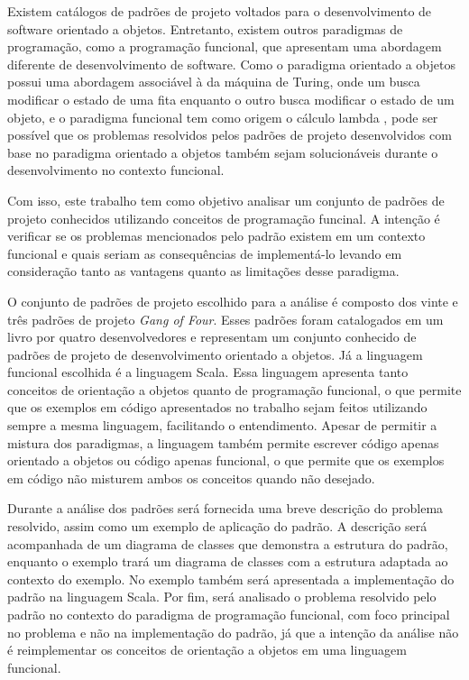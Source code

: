 
Existem catálogos de padrões de projeto 
voltados para o desenvolvimento de software 
orientado a objetos.\cite{gamma:1995} Entretanto, existem 
outros paradigmas de programação, como 
a programação funcional, que apresentam 
uma abordagem diferente de desenvolvimento 
de software.
Como o paradigma orientado a objetos possui uma 
abordagem associável à da máquina de Turing, onde um 
busca modificar o estado de uma fita enquanto o outro 
busca modificar o estado de um objeto, e o paradigma 
funcional tem como origem o cálculo lambda
\cite{michaelson:2011}, pode ser possível que os problemas 
resolvidos pelos padrões de projeto desenvolvidos 
com base no paradigma orientado a objetos também 
sejam solucionáveis durante o desenvolvimento 
no contexto funcional. 


Com isso, este trabalho tem como objetivo 
analisar um conjunto de padrões de projeto 
conhecidos utilizando conceitos de programação 
funcinal. A intenção é verificar se os 
problemas mencionados pelo padrão existem 
em um contexto funcional e quais 
seriam as consequências de implementá-lo 
levando em consideração tanto as vantagens 
quanto as limitações desse paradigma.


O conjunto de padrões de projeto escolhido 
para a análise é composto dos vinte e três 
padrões de projeto \textit{Gang of Four}. 
Esses padrões foram catalogados em um livro 
por quatro desenvolvedores e representam 
um conjunto conhecido de padrões de projeto 
de desenvolvimento orientado a objetos. \cite{gamma:1995}
Já a linguagem funcional escolhida é a 
linguagem Scala. Essa linguagem 
apresenta tanto conceitos de orientação 
a objetos quanto de programação funcional, 
o que permite que os exemplos em código 
apresentados no trabalho sejam feitos 
utilizando sempre a mesma linguagem, 
facilitando o entendimento.\cite{wampler2021}
Apesar de permitir a mistura dos 
paradigmas, a linguagem também permite  
escrever código apenas orientado a 
objetos ou código apenas funcional, 
o que permite que os exemplos em 
código não misturem ambos os conceitos 
quando não desejado.


Durante a análise dos padrões será 
fornecida uma breve descrição do problema 
resolvido, assim como um exemplo de aplicação 
do padrão. A descrição será acompanhada de 
um diagrama de classes que demonstra a 
estrutura do padrão, enquanto o exemplo 
trará um diagrama de classes com a estrutura 
adaptada ao contexto do exemplo. No exemplo 
também será apresentada a implementação 
do padrão na linguagem Scala. Por fim, será 
analisado o problema resolvido pelo padrão 
no contexto do paradigma de programação 
funcional, com foco principal no problema 
e não na implementação do padrão, já que 
a intenção da análise não é reimplementar os 
conceitos de orientação a objetos em uma 
linguagem funcional. 

